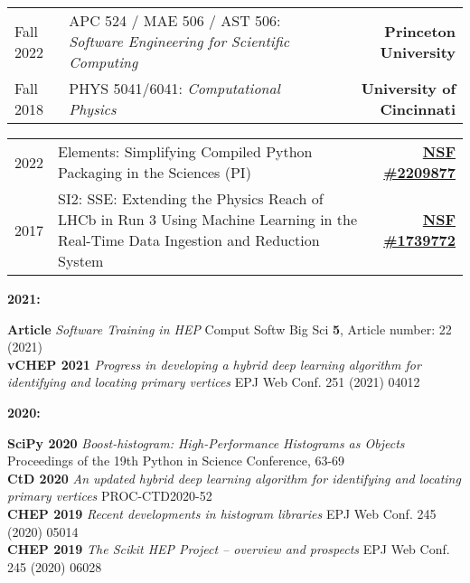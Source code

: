 \documentclass[10pt,letterpaper]{moderncv}
\begin{document}
\begin{tabularx}{\textwidth}{p{.65in}X>{\bfseries}r}
    Fall 2022 & APC 524 / MAE 506 / AST 506: \textit{Software Engineering for Scientific Computing} & Princeton University \\
    Fall 2018 & PHYS 5041/6041: \textit{Computational Physics} & University of Cincinnati \\
\end{tabularx}

\begin{tabularx}{\textwidth}{p{.5in}X>{\bfseries}r}
    2022 & Elements: Simplifying Compiled Python Packaging in the Sciences (PI) & \href{https://nsf.gov/awardsearch/showAward?AWD_ID=NSF 2209877}{NSF \#2209877} \\
    2017 & SI2: SSE: Extending the Physics Reach of LHCb in Run 3 Using Machine Learning in the Real-Time Data Ingestion and Reduction System & \href{https://nsf.gov/awardsearch/showAward?AWD_ID=1739772}{NSF \#1739772} \\ %
\end{tabularx}


\begin{minipage}[t]{.065\textwidth}
\textbf{2021:}
\end{minipage}%
\begin{minipage}[t]{.935\textwidth}
\textbf{Article} \emph{Software Training in HEP} Comput Softw Big Sci \textbf{5}, Article number: 22 (2021) \\
\textbf{vCHEP 2021} \emph{Progress in developing a hybrid deep learning algorithm for identifying and locating primary vertices} EPJ Web Conf. 251 (2021) 04012
\end{minipage}

\begin{minipage}[t]{.065\textwidth}
\textbf{2020:}
\end{minipage}%
\begin{minipage}[t]{.935\textwidth}
\textbf{SciPy 2020} \emph{Boost-histogram: High-Performance Histograms as Objects} Proceedings of the 19th Python in Science Conference, 63-69 \\
\textbf{CtD 2020}   \emph{An updated hybrid deep learning algorithm for identifying and locating primary vertices} PROC-CTD2020-52 \\
\textbf{CHEP 2019}  \emph{Recent developments in histogram libraries} EPJ Web Conf. 245 (2020) 05014 \\
\textbf{CHEP 2019}  \emph{The Scikit HEP Project -- overview and prospects} EPJ Web Conf. 245 (2020) 06028
\end{minipage}
\end{document}
